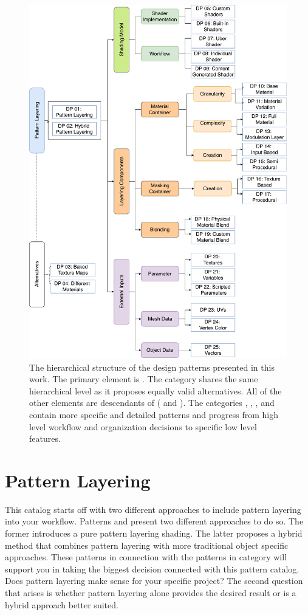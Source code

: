 \begin{figure}
	\centering
	\includegraphics[width=0.7\linewidth]{images/07cha_01_PatternDesign.pdf}
	\caption{The hierarchical structure of the design patterns presented in this work. The primary element is \emph{\patTitle}. The category \emph{\patCatAlternatives} shares the same hierarchical level as it proposes equally valid alternatives. All of the other elements are descendants of \emph{\patTitle} (\emph{\patPatternLayering} and \emph{\patPatternLayeringHybrid}). The categories \emph{\patCatShaderModel}, \emph{\patCatMaterialContainer}, \emph{\patCatMaskingContainer},\emph{\patCatBlendingModule} and  \emph{\patCatExternalInputs} contain more specific and detailed patterns and progress from high level workflow and organization decisions to specific low level features.}
	\label{image:designPatternsOverview}
\end{figure}

\section{Pattern Layering}\label{sec:patternStructure}
This catalog starts off with two different approaches to include pattern layering into your workflow. Patterns \emph{\patPatternLayering} and \emph{\patPatternLayeringHybrid} present two different approaches to do so. The former introduces a pure pattern layering shading. The latter proposes a hybrid method that combines pattern layering with more traditional object specific approaches. 
These patterns in connection with the patterns in category \emph{\patCatAlternatives} will support you in taking the biggest decision connected with this pattern catalog. Does pattern layering make sense for your specific project? The second question that arises is whether pattern layering alone provides the desired result or is a hybrid approach better suited.  

